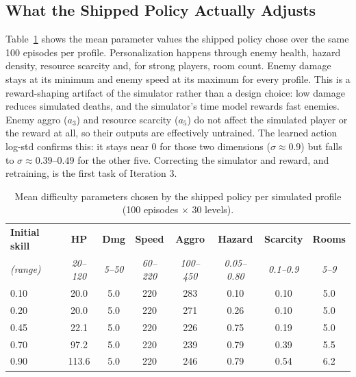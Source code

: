 \subsection{What the Shipped Policy Actually Adjusts}
\label{sec:policy_params}
Table~\ref{tab:policy_params} shows the mean parameter values the shipped policy chose over the same 100 episodes per profile. Personalization happens through enemy health, hazard density, resource scarcity and, for strong players, room count. Enemy damage stays at its minimum and enemy speed at its maximum for every profile. This is a reward-shaping artifact of the simulator rather than a design choice: low damage reduces simulated deaths, and the simulator's time model rewards fast enemies. Enemy aggro ($a_3$) and resource scarcity ($a_5$) do not affect the simulated player or the reward at all, so their outputs are effectively untrained. The learned action log-std confirms this: it stays near $0$ for those two dimensions ($\sigma \approx 0.9$) but falls to $\sigma \approx 0.39$--$0.49$ for the other five. Correcting the simulator and reward, and retraining, is the first task of Iteration 3.

\begin{table}[!htbp]
\centering
\caption{Mean difficulty parameters chosen by the shipped policy per simulated profile (100 episodes $\times$ 30 levels).}
\label{tab:policy_params}
\scriptsize
\begin{tabular}{lccccccc}
\toprule
\textbf{Initial skill} & \textbf{HP} & \textbf{Dmg} & \textbf{Speed} & \textbf{Aggro} & \textbf{Hazard} & \textbf{Scarcity} & \textbf{Rooms} \\
\textit{(range)} & \textit{20--120} & \textit{5--50} & \textit{60--220} & \textit{100--450} & \textit{0.05--0.80} & \textit{0.1--0.9} & \textit{5--9} \\
\midrule
0.10 & 20.0 & 5.0 & 220 & 283 & 0.10 & 0.10 & 5.0 \\
0.20 & 20.0 & 5.0 & 220 & 271 & 0.26 & 0.10 & 5.0 \\
0.45 & 22.1 & 5.0 & 220 & 226 & 0.75 & 0.19 & 5.0 \\
0.70 & 97.2 & 5.0 & 220 & 239 & 0.79 & 0.39 & 5.5 \\
0.90 & 113.6 & 5.0 & 220 & 246 & 0.79 & 0.54 & 6.2 \\
\bottomrule
\end{tabular}
\end{table}

